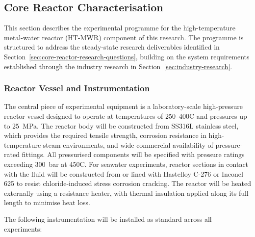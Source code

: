 \documentclass[12pt]{article}
\begin{document}
\break

\subsection{Core Reactor Characterisation}
\label{subsec:core-reactor-methodology}

This section describes the experimental programme for the high-temperature 
metal-water reactor (HT-MWR) component of this research. The programme is 
structured to address the steady-state research deliverables identified in 
Section~\ref{sec:core-reactor-research-questions}, building on the system 
requirements established through the industry research in 
Section~\ref{sec:industry-research}.

\subsubsection*{Reactor Vessel and Instrumentation}

The central piece of experimental equipment is a laboratory-scale high-pressure 
reactor vessel designed to operate at temperatures of 250--400\textdegree C and 
pressures up to 25~MPa. The reactor body will be constructed from SS316L stainless 
steel, which provides the required tensile strength, corrosion resistance in 
high-temperature steam environments, and wide commercial availability of 
pressure-rated fittings. All pressurised components will be specified with pressure 
ratings exceeding 300~bar at 450\textdegree C. For seawater experiments, reactor 
sections in contact with the fluid will be constructed from or lined with Hastelloy 
C-276 or Inconel 625 to resist chloride-induced stress corrosion cracking. The 
reactor will be heated externally using a resistance heater, with thermal insulation 
applied along its full length to minimise heat loss.

The following instrumentation will be installed as standard across all experiments:
\end{document}
